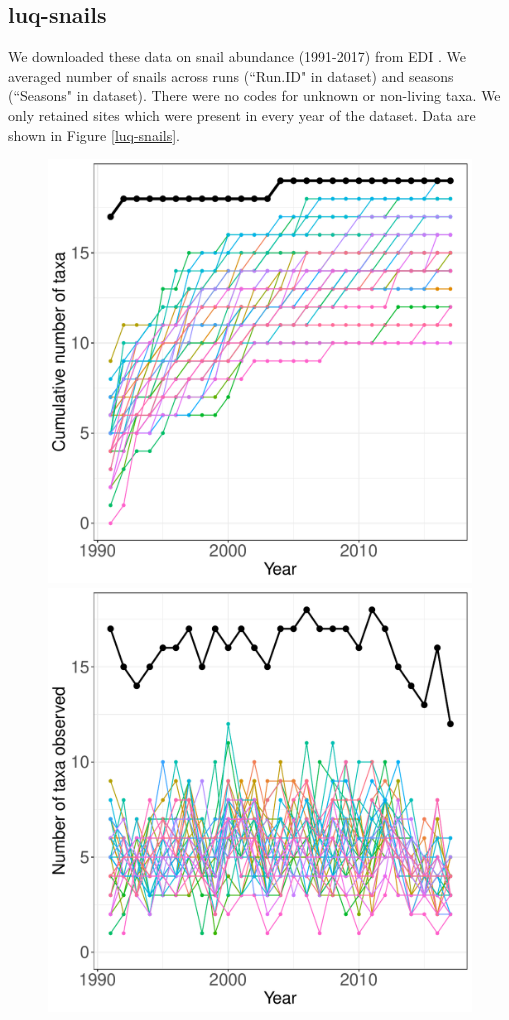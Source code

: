 \documentclass[11pt, oneside]{article}
\begin{document}
\subsection{luq-snails}
We downloaded these data on snail abundance (1991-2017) from EDI \citep{luq-snails}.
We averaged number of snails across runs (``Run.ID" in dataset) and seasons (``Seasons" in dataset). 
There were no codes for unknown or non-living taxa.
We only retained sites which were present in every year of the dataset.
Data are shown in Figure \ref{luq-snails}.

\begin{figure}[h!]
\centering
\includegraphics[scale = 0.4]{luq-snails-compagnoni_species_accumulation_curve.pdf}
\includegraphics[scale = 0.4]{luq-snails-compagnoni_num_taxa_over_time.pdf}

\end{figure}
\end{document}
